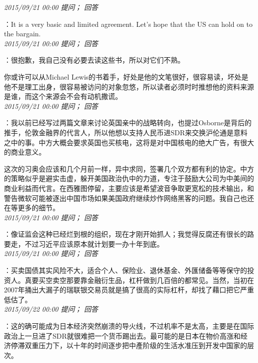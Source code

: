 \documentclass[twocolumn]{ctexart}
\begin{document}
\textit{\hfill\noindent\small 2015/09/21 00:00 提问； 回答}

：It is a very basic and limited agreement. Let's hope that the US can hold on to the bargain.\\

\textit{\hfill\noindent\small 2015/09/21 00:00 提问； 回答}

：很抱歉，我自己没有必要去读这些书，所以对它们不熟。

你或许可以从Michael Lewis的书着手，好处是他的文笔很好，很容易读，坏处是他不是理工出身，很容易被访问的对象忽悠，所以读者必须时时推想他的资料来源是谁，而这个来源会不会有动机撒谎。\\

\textit{\hfill\noindent\small 2015/09/21 00:00 提问； 回答}

：我以前已经写过两篇文章来讨论英国亲中的战略转向，也提过Osborne是背后的推手，伦敦金融界的代言人，所以他想以支持人民币进SDR来交换沪伦通是意料之中的事。中方大概会要求英国也买核电，这将是对中国核电的绝大广告，有很大的商业意义。

这次的习奥会应该和几个月前一样，异中求同，签署几个双方都有利的协定。中方的策略似乎是避实击虚，躲开美国政治仇中的力道，专注于鼓励大公司为中美间的商业利益而代言。在西雅图停留，主要应该是希望波音争取更宽松的技术输出，和警告微软可能被逐出中国市场如果美国政府继续炒作网络黑客的问题。我自己也还在等更多的细节。\\

\textit{\hfill\noindent\small 2015/09/21 00:00 提问； 回答}

：像证监会这种已经烂到根的组织，现在才刚开始抓人；我觉得反腐还有很长的路要走，不过习近平应该原本就计划要一办十年到底。\\

\textit{\hfill\noindent\small 2015/09/21 00:00 提问； 回答}

：买卖国债其实风险不大，适合个人、保险业、退休基金、外匯储备等等保守的投资人。真要买空卖空那要靠金融衍生品，杠杆做到几百倍的都常见。当然，当初在2007年捅出大漏子的瑞联银交易员就是搞了很高的实际杠杆，却找了藉口把它严重低估了。\\

\textit{\hfill\noindent\small 2015/09/22 00:00 提问； 回答}

：这的确可能成为日本经济突然崩溃的导火线，不过机率不是太高，主要是在国际政治上一旦进了SDR就很难把一个货币踢出去。最可能的是日本在物价高涨和经济停滞双重压力下，以十年的时间逐步把中產阶级的生活水准压到开发中国家的层次。\\
\end{document}
